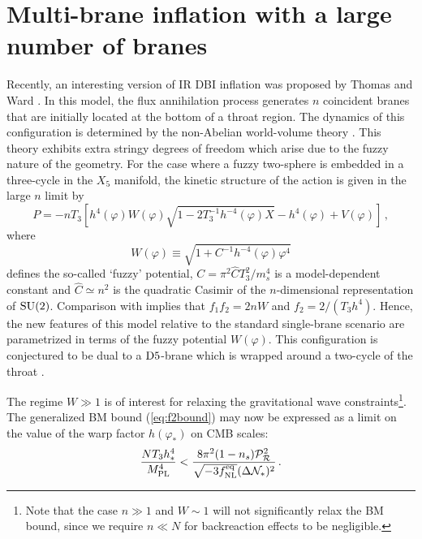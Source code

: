 \section{Multi-brane inflation with a large number of branes}
\label{sec:twlargen-multi}


Recently, an interesting version of IR DBI inflation 
was proposed by Thomas and Ward \cite{thomasward}. In this model, the flux
annihilation process 
generates $n$ coincident branes that are initially located at the 
bottom of a throat region. The dynamics of this configuration
is determined by the non-Abelian world-volume theory \cite{myers1,myers2}. 
This theory exhibits extra stringy degrees of freedom which arise due to the 
fuzzy nature of the geometry. For the case where a fuzzy two-sphere is 
embedded in a three-cycle in the $X_5$ manifold, 
the kinetic structure of the action is given in the large $n$ limit by 
\cite{thomasward}
% 
\begin{equation}
P=-nT_3 \left[ h^4(\varphi ) W(\varphi ) 
\sqrt{1-2 T_3^{-1} h^{-4}(\varphi) X}
-h^4(\varphi ) + V (\varphi ) \right] \,,
\end{equation}
% 
where
%    
\begin{equation} 
\label{eq:defW}
W (\varphi ) \equiv \sqrt{1+ C^{-1}h^{-4}(\varphi ) \varphi^4}
\end{equation}
% 
defines the so-called `fuzzy' potential, 
$C = \pi^2 \hat{C}T_3^2/m_s^4$ is a model-dependent constant and 
$\hat{C} \simeq n^2$ 
is the quadratic Casimir of the $n$-dimensional representation of 
${\rm SU}(2)$. 
Comparison with  
implies that $f_1f_2 =2nW$ and $f_2=2/(T_3h^4)$. Hence, 
the new features of this model relative to the standard single-brane 
scenario are parametrized in terms of the fuzzy potential $W (\varphi )$. 
This configuration is conjectured to be dual to 
a ${\rm D5}$-brane which is wrapped around a two-cycle 
of the throat \cite{dual1,dual2,dual3}. 


The regime $W \gg 1$ is of interest for 
relaxing the gravitational wave constraints\footnote{Note that 
the case $n \gg 1$ and
$W \sim 1$ will not significantly relax the BM bound, 
since we require $n \ll N$ for backreaction effects to be negligible.}. 
The generalized BM bound (\ref{eq:f2bound}) may now be expressed as 
a limit on the value of the warp factor $h(\varphi_*)$ on CMB scales: 
% 
\begin{equation}
\label{eq:warptorelax}
\frac{NT_3h^4_*}{M_{\mathrm{PL}}^4} < 
\frac{8\pi^2 (1-n_s)\mathcal{P}_{\mathcal{R}}^2 }{\sqrt{-3f_{\mathrm{NL}}^{\mathrm{eq}}}(\Delta \mathcal{N}_*)^2} \,.
\end{equation}
% 


